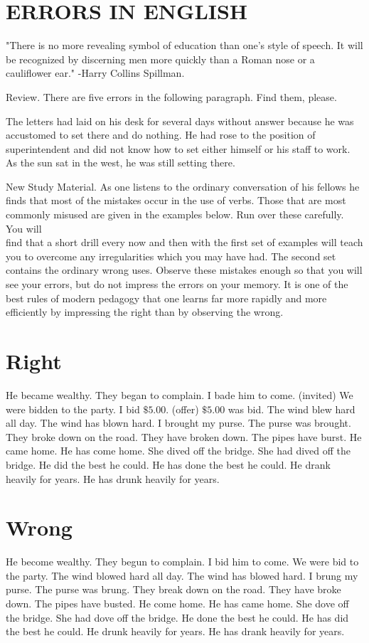\documentclass[10pt]{article}
\begin{document}
\section*{ERRORS IN ENGLISH}
"There is no more revealing symbol of education than one's style of speech. It will be recognized by discerning men more quickly than a Roman nose or a cauliflower ear." -Harry Collins Spillman.

Review. There are five errors in the following paragraph. Find them, please.

The letters had laid on his desk for several days without answer because he was accustomed to set there and do nothing. He had rose to the position of superintendent and did not know how to set either himself or his staff to work. As the sun sat in the west, he was still setting there.

New Study Material. As one listens to the ordinary conversation of his fellows he finds that most of the mistakes occur in the use of verbs. Those that are most commonly misused are given in the examples below. Run over these carefully. You will\\
find that a short drill every now and then with the first set of examples will teach you to overcome any irregularities which you may have had. The second set contains the ordinary wrong uses. Observe these mistakes enough so that you will see your errors, but do not impress the errors on your memory. It is one of the best rules of modern pedagogy that one learns far more rapidly and more efficiently by impressing the right than by observing the wrong.

\section*{Right}
He became wealthy. They began to complain. I bade him to come. (invited) We were bidden to the party. I bid $\$ 5.00$. (offer) $\$ 5.00$ was bid. The wind blew hard all day. The wind has blown hard. I brought my purse. The purse was brought. They broke down on the road. They have broken down. The pipes have burst. He came home. He has come home. She dived off the bridge. She had dived off the bridge. He did the best he could. He has done the best he could. He drank heavily for years. He has drunk heavily for years.

\section*{Wrong}
He become wealthy. They begun to complain. I bid him to come. We were bid to the party. The wind blowed hard all day. The wind has blowed hard. I brung my purse. The purse was brung. They break down on the road. They have broke down. The pipes have busted. He come home. He has came home. She dove off the bridge. She had dove off the bridge. He done the best he could. He has did the best he could. He drunk heavily for years. He has drank heavily for years.
\end{document}
